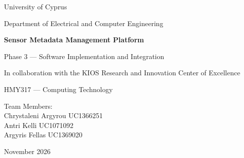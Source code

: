 \documentclass[11pt,a4paper]{article}
\begin{document}

\begin{titlepage}
    \centering

    \vspace*{2cm}

    {\Large University of Cyprus\par}

    \vspace{0.5cm}

    {\large Department of Electrical and Computer Engineering\par}

    \vspace{2.5cm}

    {\Huge\bfseries Sensor Metadata Management Platform\par}

    \vspace{0.8cm}

    {\Large Phase 3 --- Software Implementation and Integration\par}

    \vspace{0.6cm}

    {\large In collaboration with the KIOS Research and Innovation Center of Excellence\par}

    \vfill

    {\large HMY317 --- Computing Technology\par}

    \vspace{1cm}

    {\large
    Team Members:\\[0.3cm]
    Chrystaleni Argyrou UC1366251\\
    Antri Kelli UC1071092\\
    Argyris Fellas UC1369020
    \par}

    \vspace{1.8cm}

    {\large November 2026\par}

\end{titlepage}

\end{document}
